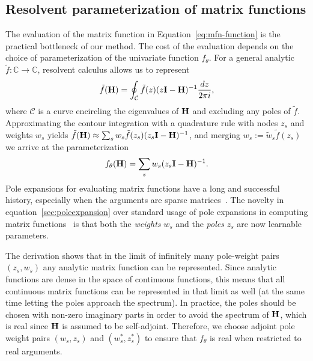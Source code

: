 \documentclass{article} \usepackage{iclr2024_conference,times}
\def\eqref#1{equation~\ref{#1}}
\begin{document}
\subsection{Resolvent parameterization of matrix functions}
\label{sec:resolvent}
The evaluation of the matrix function in Equation~\ref{eq:mfn-function} is the practical bottleneck of our method.
The cost of the evaluation depends on the choice of parameterization of the univariate function $f_\theta$. 
For a general analytic $\tilde{f} : \mathbb{C} \to \mathbb{C}$, resolvent calculus allows us to represent 
\begin{equation}
    \tilde{f}({\bf H}) = \oint_{\mathcal{C}} \tilde{f}\small(z\small)(z\mathbf{I} - {\bf H})^{-1} \frac{dz}{2\pi i}, 
\end{equation}
where $\mathcal{C}$ is a curve encircling the eigenvalues of ${\bf H}$ and excluding any poles of $\tilde{f}$. Approximating the contour integration with a quadrature rule with nodes $z_s$ and weights $w_s$ yields 
$\tilde{f}({\bf H}) \approx \sum_{s} w_{s}\tilde{f}\small(z_{s}\small)(z_{s}\mathbf{I} - {\bf H})^{-1}$, 
and merging $w_s := \tilde{w}_{s}\tilde{f}(z_{s})$ we arrive at the parameterization 
\begin{equation} \label{sec:poleexpansion}
    f_\theta({\bf H}) = \sum_{s} w_{s}(z_{s}\mathbf{I} - {\bf H})^{-1}.
\end{equation}
Pole expansions for evaluating matrix functions have a long and successful history, especially when the arguments are sparse matrices~\citep{higham2008functions}.
The novelty in \eqref{sec:poleexpansion} over standard usage of pole expansions in computing matrix functions~\citep{higham2008functions} is that both the {\em weights} $w_s$ and the {\em poles} $z_s$ are now learnable parameters.

The derivation shows that in the limit of infinitely many pole-weight pairs $(z_s, w_s)$ any analytic matrix function can be represented. Since analytic functions are dense in the space of continuous functions, this means that all continuous matrix functions can be represented in that limit as well (at the same time letting the poles approach the spectrum).
In practice, the poles should be chosen with non-zero imaginary parts in order to avoid the spectrum of ${\bf H}$, which is real since ${\bf H}$ is assumed to be self-adjoint. Therefore, we choose adjoint pole weight pairs $(w_s, z_s)$ and $(w_s^*, z_s^*)$ to ensure that $f_\theta$ is real when restricted to real arguments. 
\end{document}
